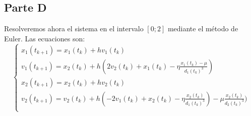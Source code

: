\documentclass[titlepage,a4paper]{article}
\begin{document}
	\subsection{Parte D}\label{sec:parteD}
	Resolveremos ahora el sistema en el intervalo $[0; 2]$ mediante el método de Euler. Las ecuaciones son:
	\begin{equation}
		\label{inicial}
		\begin{cases}
			x_1 (t_{k+1}) = x_1 (t_{k}) + hv_1 (t_{k})\\
			v_1 (t_{k+1}) = x_2 (t_{k}) + h(2v_2 (t_{k}) + x_1 (t_{k}) - \eta\frac{x_1 (t_{k}) - \mu}{d_1 (t_{k})^{3}})\\
			x_2 (t_{k+1}) = x_2 (t_{k}) + hv_2 (t_{k})\\
			v_2 (t_{k+1}) = v_2 (t_{k}) + h(-2v_1 (t_{k}) + x_2 (t_{k}) - \eta\frac{x_2 (t_{k})}{d_1 (t_{k})^{3}}) - \mu\frac{x_2 (t_{k})}{d_2 (t_{k})^{3}})\\
		\end{cases}
	\end{equation}
\end{document}
